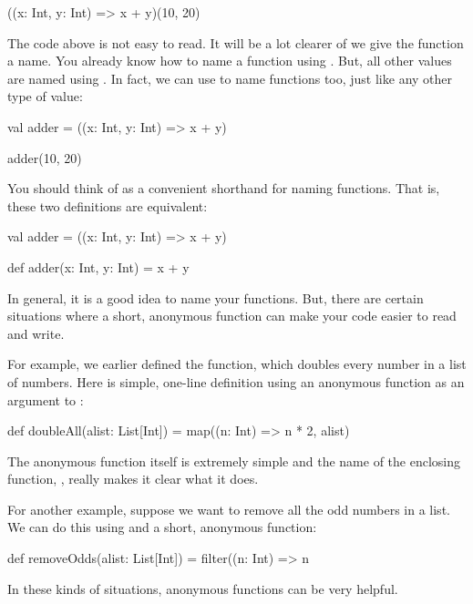\documentclass[9pt]{extbook}
\begin{document}
\begin{scalacode}
((x: Int, y: Int) => x + y)(10, 20)
\end{scalacode}

The code above is not easy to read. It will be a lot clearer of we give the
function a name. You already know how to name a function using . But, all
other values are named using . In fact, we can use  to name functions
too, just like any other type of value:

\begin{scalacode}
val adder = ((x: Int, y: Int) => x + y)

adder(10, 20)
\end{scalacode}

You should think of  as a convenient shorthand for naming functions.
That is, these two definitions are equivalent:

\begin{scalacode}
val adder = ((x: Int, y: Int) => x + y)

def adder(x: Int, y: Int) = x + y
\end{scalacode}

In general, it is a good idea to name your functions. But, there are
certain situations where a short, anonymous function can make your code
easier to read and write.

For example, we earlier defined the  function, which doubles
every number in a list of numbers. Here is simple, one-line definition
using an anonymous function as an argument to :

\begin{scalacode}
def doubleAll(alist: List[Int]) = map((n: Int) => n * 2, alist)
\end{scalacode}

The anonymous function itself is extremely simple and the name of the enclosing
function, , really makes it clear what it does.

For another example, suppose we want to remove all the odd numbers
in a list. We can do this using  and a short, anonymous function:

\begin{scalacode}
def removeOdds(alist: List[Int]) = filter((n: Int) => n %
\end{scalacode}

In these kinds of situations, anonymous functions can be very helpful.
\end{document}

